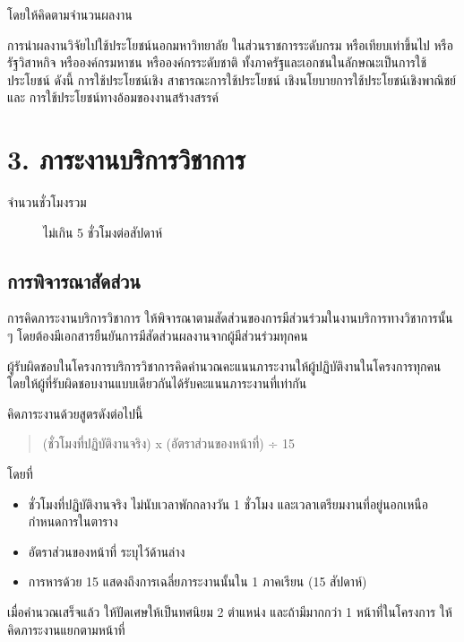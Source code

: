 \documentclass[a4paper,12pt,english]{sphinxmanual}
\begin{document}
โดยให้คิดตามจำนวนผลงาน

การนำผลงานวิจัยไปใช้ประโยชน์นอกมหาวิทยาลัย ในส่วนราชการระดับกรม หรือเทียบเท่าขึ้นไป หรือรัฐวิสาหกิจ หรือองค์กรมหาชน หรือองค์กรระดับชาติ ทั้งภาครัฐและเอกชนในลักษณะเป็นการใช้ประโยชน์ ดังนี้ การใช้ประโยชน์เชิง สาธารณะการใช้ประโยชน์ เชิงนโยบายการใช้ประโยชน์เชิงพาณิชย์ และ การใช้ประโยชน์ทางอ้อมของงานสร้างสรรค์


\chapter{3. ภาระงานบริการวิชาการ}
\label{\detokenize{3service:id1}}\label{\detokenize{3service::doc}}\begin{description}
\item[{จำนวนชั่วโมงรวม}] \leavevmode
ไม่เกิน 5 ชั่วโมงต่อสัปดาห์

\end{description}


\section{การพิจารณาสัดส่วน}
\label{\detokenize{3service:id2}}
การคิดภาระงานบริการวิชาการ ให้พิจารณาตามสัดส่วนของการมีส่วนร่วมในงานบริการทางวิชาการนั้น ๆ โดยต้องมีเอกสารยืนยันการมีสัดส่วนผลงานจากผู้มีส่วนร่วมทุกคน

ผู้รับผิดชอบในโครงการบริการวิชาการคิดคำนวณคะแนนภาระงานให้ผู้ปฏิบัติงานในโครงการทุกคน โดยให้ผู้ที่รับผิดชอบงานแบบเดียวกันได้รับคะแนนภาระงานที่เท่ากัน

คิดภาระงานด้วยสูตรดังต่อไปนี้
\begin{quote}

(ชั่วโมงที่ปฏิบัติงานจริง) x (อัตราส่วนของหน้าที่) ÷ 15
\end{quote}

โดยที่
\begin{itemize}
\item {} 
ชั่วโมงที่ปฏิบัติงานจริง ไม่นับเวลาพักกลางวัน 1 ชั่วโมง และเวลาเตรียมงานที่อยู่นอกเหนือกำหนดการในตาราง

\item {} 
อัตราส่วนของหน้าที่ ระบุไว้ด้านล่าง

\item {} 
การหารด้วย 15 แสดงถึงการเฉลี่ยภาระงานนั้นใน 1 ภาคเรียน (15 สัปดาห์)

\end{itemize}

เมื่อคำนวณเสร็จแล้ว ให้ปัดเศษให้เป็นทศนิยม 2 ตำแหน่ง และถ้ามีมากกว่า 1 หน้าที่ในโครงการ ให้คิดภาระงานแยกตามหน้าที่
\end{document}
